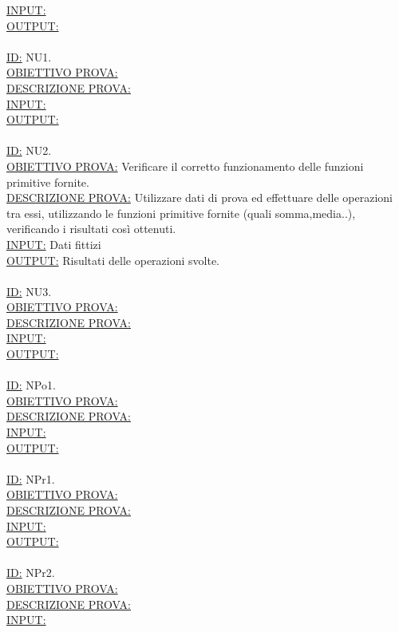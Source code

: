 \documentclass[11pt,titlepage,a4paper]{report}
\begin{document}
\underline{INPUT:}  \\
\underline{OUTPUT:}  \\
\\
\underline{ID:} NU1.\\
\underline{OBIETTIVO PROVA:} \\
\underline{DESCRIZIONE PROVA:}  \\
\underline{INPUT:}  \\
\underline{OUTPUT:}  \\
\\
\underline{ID:} NU2.\\
\underline{OBIETTIVO PROVA:} Verificare il corretto funzionamento delle funzioni primitive fornite.\\
\underline{DESCRIZIONE PROVA:} Utilizzare dati di prova ed effettuare delle operazioni tra essi, utilizzando le funzioni primitive fornite (quali somma,media..), verificando i risultati cos\`i ottenuti. \\
\underline{INPUT:} Dati fittizi \\
\underline{OUTPUT:} Risultati delle operazioni svolte. \\
\\
\underline{ID:} NU3.\\
\underline{OBIETTIVO PROVA:} \\
\underline{DESCRIZIONE PROVA:}  \\
\underline{INPUT:}  \\
\underline{OUTPUT:}  \\
\\
\underline{ID:} NPo1.\\
\underline{OBIETTIVO PROVA:}  \\
\underline{DESCRIZIONE PROVA:}  \\
\underline{INPUT:}  \\
\underline{OUTPUT:}  \\
\\
\underline{ID:} NPr1.\\
\underline{OBIETTIVO PROVA:}  \\
\underline{DESCRIZIONE PROVA:}  \\
\underline{INPUT:}  \\
\underline{OUTPUT:}  \\
\\
\underline{ID:} NPr2.\\
\underline{OBIETTIVO PROVA:}  \\
\underline{DESCRIZIONE PROVA:}  \\
\underline{INPUT:}  \\
\end{document}
